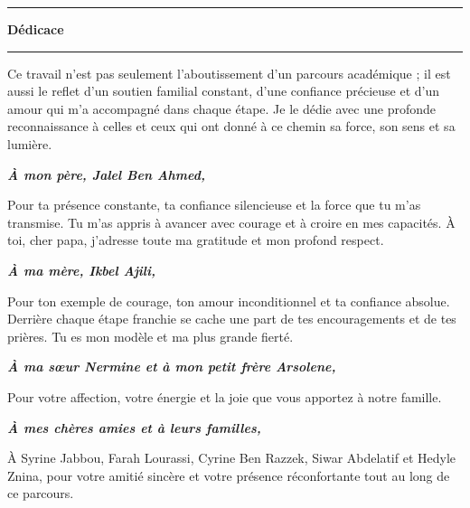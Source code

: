 \documentclass[12pt,a4paper]{report}
\begin{document}
\clearpage{}\setcounter{page}{1}\pagestyle{fancy}

\thispagestyle{plain}
\vspace*{1.2cm}
\noindent\hspace*{1.25cm}\begin{minipage}[c]{0.06\textwidth}\color{black}\rule{0.42cm}{1.25cm}\end{minipage}\hspace{-0.15cm}%
\begin{minipage}[c]{0.75\textwidth}{\LARGE\bfseries Dédicace}\\[-0.15cm]\color{black}\rule{0.78\textwidth}{0.5pt}\end{minipage}
\vspace{1.35cm}
Ce travail n'est pas seulement l'aboutissement d'un parcours académique ; il est aussi le reflet d'un soutien familial constant, d'une confiance précieuse et d'un amour qui m'a accompagné dans chaque étape. Je le dédie avec une profonde reconnaissance à celles et ceux qui ont donné à ce chemin sa force, son sens et sa lumière.

\begin{center}\textbf{\textit{À mon père, Jalel Ben Ahmed,}}\end{center}
Pour ta présence constante, ta confiance silencieuse et la force que tu m'as transmise. Tu m'as appris à avancer avec courage et à croire en mes capacités. À toi, cher papa, j'adresse toute ma gratitude et mon profond respect.

\begin{center}\textbf{\textit{À ma mère, Ikbel Ajili,}}\end{center}
Pour ton exemple de courage, ton amour inconditionnel et ta confiance absolue. Derrière chaque étape franchie se cache une part de tes encouragements et de tes prières. Tu es mon modèle et ma plus grande fierté.

\begin{center}\textbf{\textit{À ma sœur Nermine et à mon petit frère Arsolene,}}\end{center}
Pour votre affection, votre énergie et la joie que vous apportez à notre famille.

\begin{center}\textbf{\textit{À mes chères amies et à leurs familles,}}\end{center}
À Syrine Jabbou, Farah Lourassi, Cyrine Ben Razzek, Siwar Abdelatif et Hedyle Znina, pour votre amitié sincère et votre présence réconfortante tout au long de ce parcours.
\end{document}
